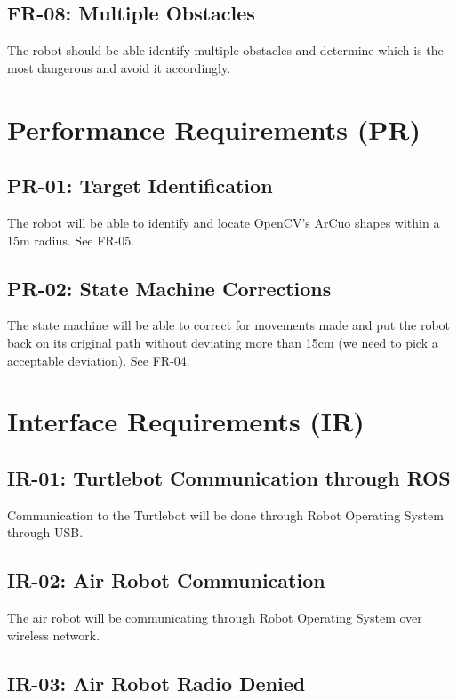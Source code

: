 \documentclass[]{report}
\begin{document}
\subsection{FR-08: Multiple Obstacles}
The robot should be able identify multiple obstacles and determine which is the most dangerous and avoid it accordingly. 


\section{Performance Requirements (PR)}

\subsection{PR-01: Target Identification}
The robot will be able to identify and locate OpenCV's ArCuo shapes within a 15m radius. See FR-05.

\subsection{PR-02: State Machine Corrections}
The state machine will be able to correct for movements made and put the robot back on its original path without deviating more than 15cm (we need to pick a acceptable deviation). See FR-04.


\section{Interface Requirements (IR)}

\subsection{IR-01: Turtlebot Communication through ROS}

Communication to the Turtlebot will be done through Robot Operating System through USB.

\subsection{IR-02: Air Robot Communication}

The air robot will be communicating through Robot Operating System over wireless network.

\subsection{IR-03: Air Robot Radio Denied}
\end{document}
